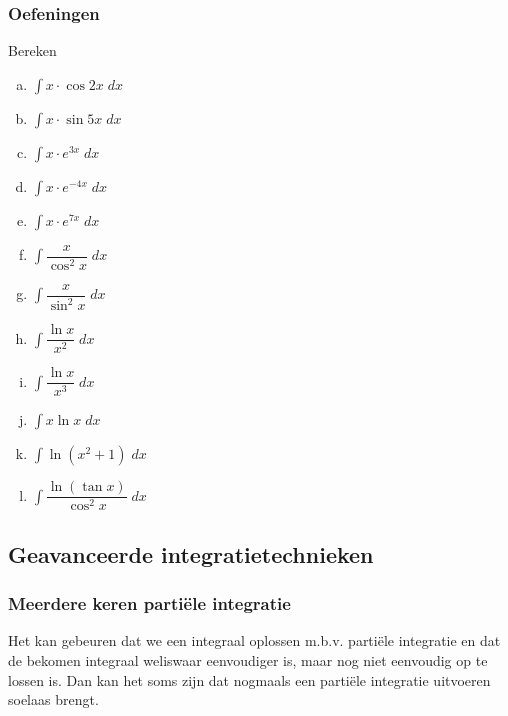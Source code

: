 \documentclass[a4paper,12pt, twoside]{article}
\begin{document}
\subsubsection{Oefeningen}

\begin{oefening}
  Bereken
  \begin{multicols}{2}
  \begin{enumerate}[(a)]
  \item $\displaystyle\int x \cdot \cos 2x \;dx$
  \item $\displaystyle\int x \cdot \sin 5x \;dx$
  \item $\displaystyle\int x \cdot e^{3x} \;dx$
  \item $\displaystyle\int x \cdot e^{-4x} \;dx$
  \item $\displaystyle\int x \cdot e^{7x} \;dx$
  \item $\displaystyle\int \dfrac{x}{\cos^2 x} \;dx$
  \item $\displaystyle\int \dfrac{x}{\sin^2 x} \;dx$
  \item $\displaystyle\int \dfrac{\ln x}{x^2} \;dx$
  \item $\displaystyle\int \dfrac{\ln x}{x^3} \;dx$
  \item $\displaystyle\int x \ln x \;dx$
  \item $\displaystyle\int \ln(x^2 + 1) \;dx$
  \item $\displaystyle\int \dfrac{\ln(\tan x)}{\cos^2 x} \;dx$
  \end{enumerate}
\end{multicols}
\end{oefening}

\subsection{Geavanceerde integratietechnieken}

\subsubsection{Meerdere keren partiële integratie}

Het kan gebeuren dat we een integraal oplossen m.b.v. partiële integratie en dat de bekomen integraal weliswaar eenvoudiger is, maar nog niet eenvoudig op te lossen is. Dan kan het soms zijn dat nogmaals een partiële integratie uitvoeren soelaas brengt.
\end{document}
